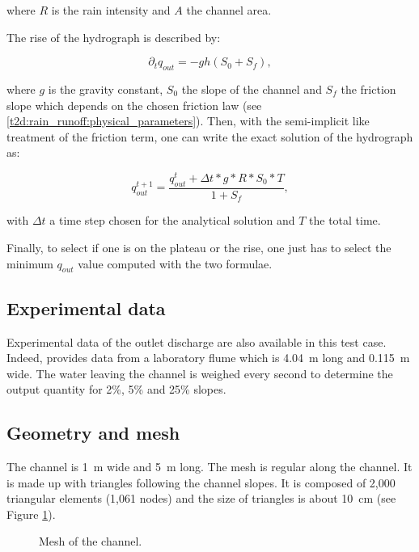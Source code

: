 where $R$ is the rain intensity and $A$ the channel area. 

The rise of the hydrograph is described by:

\begin{equation}
 \partial_tq_{out}=-gh(S_0+S_f),
\end{equation}

where $g$ is the gravity constant, $S_0$ the slope of the channel and
$S_f$ the friction slope which depends on the chosen friction law
(see \ref{t2d:rain_runoff:physical_parameters}).
Then, with the semi-implicit like treatment of the friction term, one can write
the exact solution of the hydrograph as:

\begin{equation}
 q_{out}^{t+1}=\dfrac{q_{out}^{t}+\Delta t*g*R*S_0*T}{1+S_f},
\end{equation}

with $\Delta t$ a time step chosen for the analytical solution and $T$ the total time. 

Finally, to select if one is on the plateau or the rise, one just has to select
the minimum $q_{out}$ value computed with the two formulae.

\subsection{Experimental data}

Experimental data of the outlet discharge are also available in this test case.
Indeed, \cite{Kirstetter2015} provides data from a laboratory flume which is
4.04~m long and 0.115~m wide.
The water leaving the channel is weighed every second to determine the output
quantity for 2\%, 5\% and 25\% slopes.

\subsection{Geometry and mesh}

The channel is 1~m wide and 5~m long.
The mesh is regular along the channel. It is made up with
triangles following the channel slopes.
It is composed of 2,000 triangular elements (1,061 nodes)
and the size of triangles is about 10~cm
(see Figure \ref{t2d:rain_runoff:fig:mesh}).

\begin{figure}[!htbp]
 \centering
 \caption{Mesh of the channel.}
 \label{t2d:rain_runoff:fig:mesh}
\end{figure}

